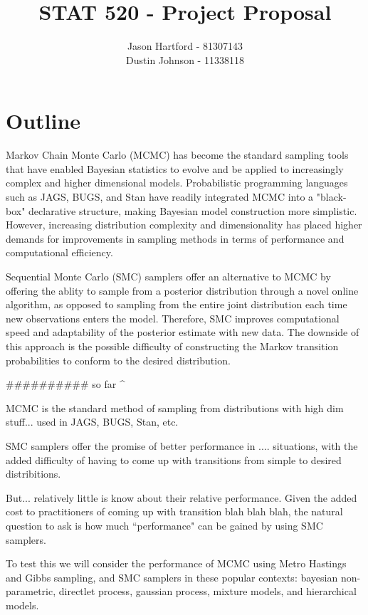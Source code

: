 \documentclass[11pt, oneside]{amsart}
\title{STAT 520 - Project Proposal}
\author{Jason Hartford - 81307143 \\
Dustin Johnson - 11338118}
\begin{document}
\maketitle


\section{Outline}

Markov Chain Monte Carlo (MCMC) has become the standard sampling tools that have enabled Bayesian statistics to evolve and be applied to increasingly complex and higher dimensional models. Probabilistic programming languages such as JAGS, BUGS, and Stan have readily integrated MCMC into a "black-box" declarative structure, making Bayesian model construction more simplistic. However, increasing distribution complexity and dimensionality has placed higher demands for improvements in sampling methods in terms of performance and computational efficiency. 
	
Sequential Monte Carlo (SMC) samplers offer an alternative to MCMC by offering the ablity to sample from a posterior distribution through a novel online algorithm, as opposed to sampling from the entire joint distribution each time new observations enters the model. Therefore, SMC improves computational speed and adaptability of the posterior estimate with new data. The downside of this approach is the possible difficulty of constructing the Markov transition probabilities to conform to the desired distribution.

########## so far ^

MCMC is the standard method of sampling from distributions with high dim stuff...  used in JAGS, BUGS, Stan, etc.

SMC samplers offer the promise of better performance in .... situations, with the added difficulty of having to come up with transitions from simple to desired distribitions.

But... relatively little is know about their relative performance. Given the added cost to practitioners of coming up with transition blah blah blah, the natural question to ask is how much ``performance" can be gained by using SMC samplers.

To test this we will consider the performance of MCMC using Metro Hastings and Gibbs sampling, and SMC samplers in these popular contexts: bayesian non-parametric, directlet process, gaussian process, mixture models, and hierarchical models.

% 
\end{document}
